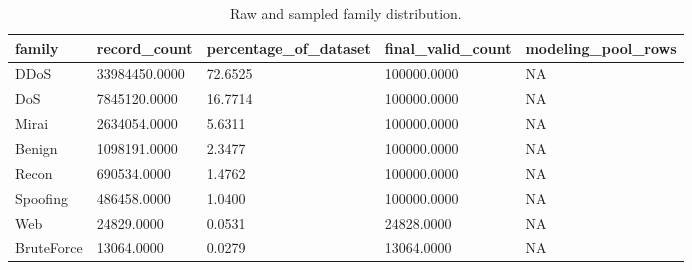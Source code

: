 \begin{table}
\caption{Raw and sampled family distribution.}
\label{tab:table02_family_distribution}
\begin{tabular}{lllll}
\toprule
family & record\_count & percentage\_of\_dataset & final\_valid\_count & modeling\_pool\_rows \\
\midrule
DDoS & 33984450.0000 & 72.6525 & 100000.0000 & NA \\
DoS & 7845120.0000 & 16.7714 & 100000.0000 & NA \\
Mirai & 2634054.0000 & 5.6311 & 100000.0000 & NA \\
Benign & 1098191.0000 & 2.3477 & 100000.0000 & NA \\
Recon & 690534.0000 & 1.4762 & 100000.0000 & NA \\
Spoofing & 486458.0000 & 1.0400 & 100000.0000 & NA \\
Web & 24829.0000 & 0.0531 & 24828.0000 & NA \\
BruteForce & 13064.0000 & 0.0279 & 13064.0000 & NA \\
\bottomrule
\end{tabular}
\end{table}
